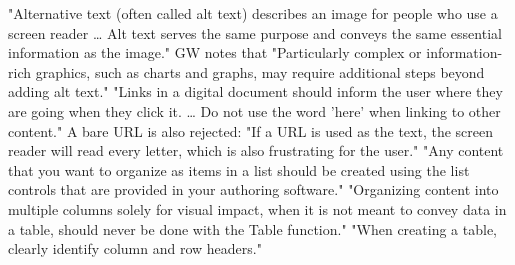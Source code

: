 	{"Alternative text (often called alt text) describes an image for people who
	 use a screen reader … Alt text serves the same purpose and conveys the same
	 essential information as the image." GW notes that "Particularly complex or
	 information-rich graphics, such as charts and graphs, may require additional
	 steps beyond adding alt text."}
	{"Links in a digital document should inform the user where they are going
	 when they click it. … Do not use the word 'here' when linking to other
	 content." A bare URL is also rejected: "If a URL is used as the text, the
	 screen reader will read every letter, which is also frustrating for the
	 user."}
	{"Any content that you want to organize as items in a list should be created
	 using the list controls that are provided in your authoring software."}
	{"Organizing content into multiple columns solely for visual impact, when it
	 is not meant to convey data in a table, should never be done with the Table
	 function." "When creating a table, clearly identify column and row
	 headers."}

\newcommand{\thesis@gwu@school}{}
\newcommand{\gwuschool}[1]{\renewcommand{\thesis@gwu@school}{#1}}
\newcommand{\thesis@gwu@prior}{}
\newcommand{\gwupriordegrees}[1]{\renewcommand{\thesis@gwu@prior}{#1}}
\newcommand{\thesis@gwu@defense}{}
\newcommand{\gwudefensedate}[1]{\renewcommand{\thesis@gwu@defense}{#1}}
\newcommand{\thesis@gwu@diss}{dissertation}
\newcommand{\thesis@gwu@needschool}{%
	\ifx\thesis@gwu@school\@empty
		\ClassWarningNoLine{texlib-thesis}{GW names the School or College on the
			title page^^J%
			and again on the certification page. Set \string\gwuschool{} or^^J%
			those lines will be filed incomplete}%
	\fi
}

